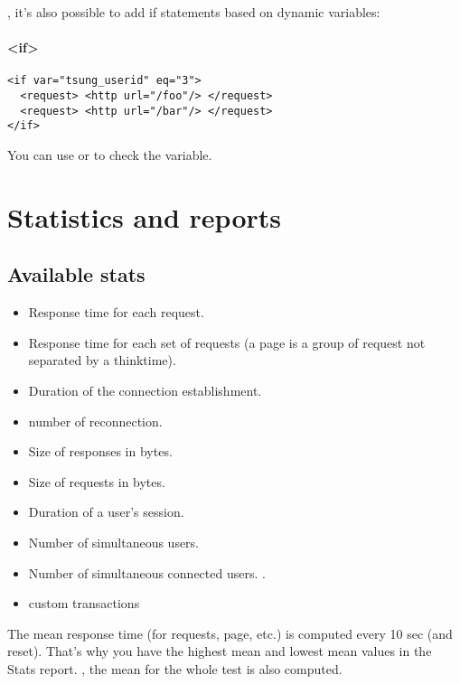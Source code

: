 \documentclass{TSUNG-en}
\begin{document}
, it's also possible to add if statements based on
dynamic variables:
\paragraph{<if>}

\begin{Verbatim}
<if var="tsung_userid" eq="3">  
  <request> <http url="/foo"/> </request>
  <request> <http url="/bar"/> </request>
</if>
\end{Verbatim}

You can use  or  to check the variable.

\section{Statistics and reports}
\label{sec:statistics-reports}

\subsection{Available stats}

\begin{itemize}
\item  {} Response time for each request.
\item  {} Response time for each set of requests (a page is a group
  of request not separated by a thinktime).
\item  {} Duration of the connection establishment.
\item  {} number of reconnection.
\item  {} Size of responses in bytes.
\item  {} Size of requests in bytes.
\item  {} Duration of a user's session.
\item  {} Number of simultaneous users.
\item  {} Number of simultaneous connected users. .
\item  custom transactions
\end{itemize}

The mean response time (for requests, page, etc.) is computed every 10
sec (and reset). That's why you have the highest mean and lowest mean
values in the Stats report. , the mean for
the whole test is also computed.
\end{document}
